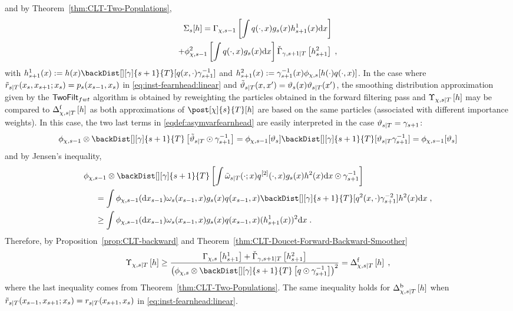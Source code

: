 and by Theorem~\ref{thm:CLT-Two-Populations},
\begin{multline*}
\Sigma_s[h] = \asymVar[\Xinit]{s-1}{\int q(\cdot,x)g_s(x)h^1_{s+1}(x)\rmd x} \\
+ \filt{\Xinit,s-1}^2\left[ \int  q(\cdot,x) g_s(x) \rmd x\right]\backasymVar[\gamma]{s+1}{T}{h^2_{s+1}}\eqsp,
\end{multline*}
with $h^1_{s+1}(x)\eqdef h(x)\backDist[][\gamma]{s+1}{T}[q(x,\cdot)\gamma_{s+1}^{-1}]$ and $h^2_{s+1}(x)\eqdef \gamma_{s+1}^{-1}(x)\filt{\Xinit,s}[h(\cdot)q(\cdot,x)]$. In the case where $\kiss[smooth]{s}{T}(x_s,x_{s+1}; x_s) = \kissforward{s}{s}(x_{s-1}, x_s)$ in \eqref{eq:inst-fearnhead:linear} and $\adjfunc[smooth]{s}{T}{x,x'} = \adjfuncforward{s}(x)\adjfunc{s}{T}{x'}$, the smoothing distribution approximation given by the $\mathsf{TwoFilt}_{fwt}$ algorithm is obtained by reweighting the particles obtained in the forward filtering pass and $\asymVarFearnhead[\Xinit]{s}{T}{h}$ may be compared to $\asymVarDoucet[\Xinit]{\forward}{s}{T}{h}$ as both approximations of $\post[\Xinit]{s}{T}[h]$ are based on the same particles (associated with different importance weights). In this case, the two last terms in \eqref{eqdef:asymvarfearnhead} are easily interpreted in the case  $\adjfunc{s}{T}{} = \gamma_{s+1}$:
\[
\filt{\Xinit,s-1} \otimes \backDist[][\gamma]{s+1}{T} \left[\adjfunc[smooth]{s}{T}{} \odot \fakeprior^{-1}_{s+1} \right] = \filt{\Xinit,s-1}[ \adjfuncforward{s}]\backDist[][\gamma]{s+1}{T}[\adjfunc{s}{T}{}\fakeprior^{-1}_{s+1}] = \filt{\Xinit,s-1}[ \adjfuncforward{s}]
\]
and by Jensen's inequality,
\begin{align*}
&\filt{\Xinit,s-1} \otimes \backDist[][\gamma]{s+1}{T}\left[ \int \smwghtfunc{s}{T}(\cdot;x) q^{[2]}(\cdot,x) g_s(x) h^2(x) \rmd x \odot \fakeprior^{-1}_{s+1} \right] \\
&\hspace{.5cm}= \int \filt{\Xinit,s-1}(\rmd x_{s-1})\omega_s(x_{s-1},x)g_s(x)q(x_{s-1},x)\backDist[][\gamma]{s+1}{T}[q^2(x,\cdot)\gamma_{s+1}^{-2}]h^2(x) \rmd x\eqsp,\\
&\hspace{.5cm}\ge \int \filt{\Xinit,s-1}(\rmd x_{s-1})\omega_s(x_{s-1},x)g_s(x)q(x_{s-1},x)(h^1_{s+1}(x))^2 \rmd x\eqsp.
\end{align*}
Therefore, by Proposition~\ref{prop:CLT-backward} and Theorem~\ref{thm:CLT-Doucet-Forward-Backward-Smoother}
\[
\asymVarFearnhead[\Xinit]{s}{T}{h} \ge \frac{\asymVar[\Xinit]{s}{h^1_{s+1}} + \backasymVar[\gamma]{s+1}{T}{h^2_{s+1}}}{\left(\filt{\Xinit,s} \otimes \backDist[][\gamma]{s+1}{T} \left[q\odot \fakeprior_{s+1}^{-1} \right]\right)^2}=\asymVarDoucet[\Xinit]{\forward}{s}{T}{h}\eqsp,
\]
where the last inequality comes from Theorem~\ref{thm:CLT-Two-Populations}. The same inequality holds for $\asymVarDoucet[\Xinit]{\backward}{s}{T}{h}$ when $\kiss[smooth]{s}{T}(x_{s-1},x_{s+1}; x_s) = \kiss{s}{T}(x_{s+1}, x_s)$ in \eqref{eq:inst-fearnhead:linear}.


